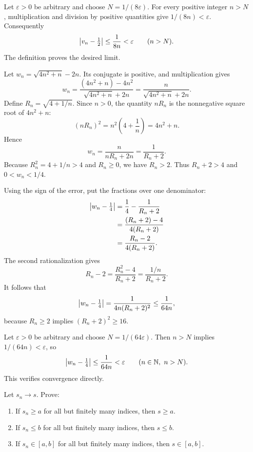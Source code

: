 Let $\varepsilon>0$ be arbitrary and choose $N=1/(8\varepsilon)$.
For every positive integer $n>N$, multiplication and division by
positive quantities give $1/(8n)<\varepsilon$.
Consequently
\[
 \left|v_n-\tfrac12\right|\le\frac1{8n}<\varepsilon
 \qquad(n>N).
\]
The definition proves the desired limit.


Let $w_n=\sqrt{4n^2+n}-2n$.
Its conjugate is positive, and multiplication gives
\[
 w_n=\frac{(4n^2+n)-4n^2}{\sqrt{4n^2+n}+2n}
     =\frac{n}{\sqrt{4n^2+n}+2n}.
\]
Define $R_n=\sqrt{4+1/n}$. Since $n>0$, the quantity $nR_n$ is
the nonnegative square root of $4n^2+n$:
\[
 (nR_n)^2=n^2\left(4+\frac1n\right)=4n^2+n.
\]
Hence
\[
 w_n=\frac{n}{nR_n+2n}=\frac1{R_n+2}.
\]
Because $R_n^2=4+1/n>4$ and $R_n\ge0$, we have $R_n>2$.
Thus $R_n+2>4$ and $0<w_n<1/4$.

Using the sign of the error, put the fractions over one denominator:
\begin{align*}
 \left|w_n-\tfrac14\right|
   &=\frac14-\frac1{R_n+2}\\
   &=\frac{(R_n+2)-4}{4(R_n+2)}\\
   &=\frac{R_n-2}{4(R_n+2)}.
\end{align*}
The second rationalization gives
\[
 R_n-2
   =\frac{R_n^2-4}{R_n+2}
   =\frac{1/n}{R_n+2}.
\]
It follows that
\[
 \left|w_n-\tfrac14\right|
   =\frac1{4n(R_n+2)^2}
   \le\frac1{64n},
\]
because $R_n\ge2$ implies $(R_n+2)^2\ge16$.

Let $\varepsilon>0$ be arbitrary and choose $N=1/(64\varepsilon)$.
Then $n>N$ implies $1/(64n)<\varepsilon$, so
\[
 \left|w_n-\tfrac14\right|\le\frac1{64n}<\varepsilon
 \qquad(n\in\mathbb{N},\ n>N).
\]
This verifies convergence directly.



\goal Let $s_n\to s$. Prove:
\begin{enumerate}[label=(\alph*)]
 \item If $s_n\ge a$ for all but finitely many indices, then $s\ge a$.
 \item If $s_n\le b$ for all but finitely many indices, then $s\le b$.
 \item If $s_n\in[a,b]$ for all but finitely many indices, then
       $s\in[a,b]$.
\end{enumerate}

